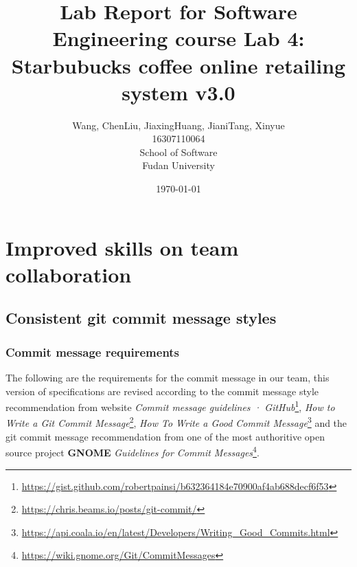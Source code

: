 \documentclass[a4paper]{report}
\title{Lab Report for Software Engineering course \newline
 Lab 4: Starbubucks coffee online retailing system v3.0}
\author{Wang, Chen\qquad Liu, Jiaxing\qquad Huang, Jiani\qquad Tang, Xinyue \\
16307110064\qquad17302010049\qquad 17302010063\qquad 16307110476 \\
School of Software\\
Fudan University
}
\date{\today}
\begin{document}
\maketitle

\tableofcontents
\chapter{Improved skills on team collaboration}
\section{Consistent git commit message styles}
\subsection{Commit message requirements}
The following are the requirements for the commit message in our team, this version of specifications are revised according to the commit message style recommendation from website \emph{Commit message guidelines · GitHub}\footnote{\url{https://gist.github.com/robertpainsi/b632364184e70900af4ab688decf6f53}}, \emph{How to Write a Git Commit Message}\footnote{\url{https://chris.beams.io/posts/git-commit/}}, \emph{How To Write a Good Commit Message}\footnote{\url{https://api.coala.io/en/latest/Developers/Writing_Good_Commits.html}} and the git commit message recommendation from one of the most authoritive open source project \textbf{GNOME} \emph{Guidelines for Commit Messages}\footnote{\url{https://wiki.gnome.org/Git/CommitMessages}}.
\end{document}
